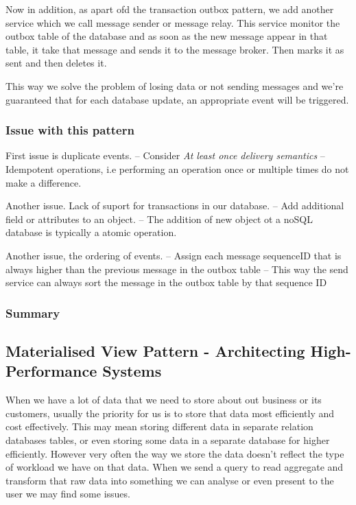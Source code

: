 Now in addition, as apart ofd the transaction outbox pattern, we add another service which we call message sender or message relay.
This service monitor the outbox table of the database and as soon as the new message appear in that table, it take that message and sends it to the message broker.
Then marks it as sent and then deletes it.

This way we solve the problem of losing data or not sending messages and we're guaranteed that for each database update, an appropriate event will be triggered.

\subsubsection{Issue with this pattern}
First issue is duplicate events.
-- Consider \textit{At least once delivery semantics}
-- Idempotent operations, i.e performing an operation once or multiple times do not make a difference.

Another issue. Lack of suport for transactions in our database.
-- Add additional field or attributes to an object.
-- The addition of new object ot a noSQL database is typically a atomic operation.

Another issue, the ordering of events.
-- Assign each message sequenceID that is always higher than the previous message in the outbox table
-- This way the send service can always sort the message in the outbox table by that sequence ID

\subsubsection{Summary}

\subsection{Materialised View Pattern - Architecting High-Performance Systems}
When we have a lot of data that we need to store about out business or its customers, usually the priority for us is to store that data most efficiently and cost effectively.
This may mean storing different data in separate relation databases tables, or even storing some data in a separate database for higher efficiently.
However very often the way we store the data doesn't reflect the type of workload we have on that data.
When we send a query to read aggregate and transform that raw data into something we can analyse or even present to the user we may find some issues.

